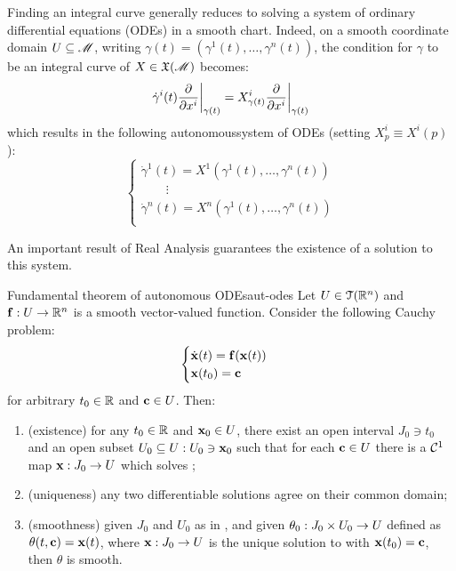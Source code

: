 Finding an integral curve generally reduces to solving a system of ordinary differential equations (ODEs) in a smooth chart. Indeed, on a smooth coordinate domain $ U \subseteq \mathscr{M} $, writing $ \gamma(t) = (\gamma^1(t) , \dots , \gamma^n(t)) $, the condition for $ \gamma $ to be an integral curve of $ X \in \mathfrak{X}(\mathscr{M}) $ becomes:
\begin{equation*}
  \dot{\gamma}^i(t) \frac{\partial}{\partial x^i} \bigg\vert_{\gamma(t)} = X^i_{\gamma(t)} \frac{\partial}{\partial x^i} \bigg\vert_{\gamma(t)}
\end{equation*}
which results in the following autonomous\footnotemark system of ODEs (setting $ X^i_p \equiv X^i(p) $):
\begin{equation}
  \begin{cases}
    \dot{\gamma}^1(t) = X^1(\gamma^1(t) , \dots , \gamma^n(t)) \\
    \qquad \vdots \\
    \dot{\gamma}^n(t) = X^n(\gamma^1(t) , \dots , \gamma^n(t)) \\
  \end{cases}
  \label{eq:aut-sys}
\end{equation}


An important result of Real Analysis guarantees the existence of a solution to this system.

\begin{theorem}{Fundamental theorem of autonomous ODEs}{aut-odes}
  Let $ U \in \EuScript{T}(\mathbb{R}^n) $ and $ \mathbf{f}  : U \rightarrow \mathbb{R}^n $ is a smooth vector-valued function. Consider the following Cauchy problem:
  \begin{equation}
    \begin{cases}
      \dot{\mathbf{x}}(t) = \mathbf{f}(\mathbf{x}(t)) \\
      \mathbf{x}(t_0) = \mathbf{c}
    \end{cases}
    \label{eq:aut-ode-sys}
  \end{equation}
  for arbitrary $ t_0 \in \mathbb{R} $ and $ \mathbf{c} \in U $. Then:
  \begin{enumerate}
    \item \label{item:aut-ode-1} (existence) for any $ t_0 \in \mathbb{R} $ and $ \mathbf{x}_0 \in U $, there exist an open interval $ J_0 \ni t_0 $ and an open subset $ U_0 \subseteq U : U_0 \ni \mathbf{x}_0 $ such that for each $ \mathbf{c} \in U $ there is a $ \mathcal{C}^{1} $ map $ \mathbf{x} : J_0 \rightarrow U $ which solves ;
    \item \label{item:aut-ode-2} (uniqueness) any two differentiable solutions agree on their common domain;
    \item \label{item:aut-ode-3} (smoothness) given $ J_0 $ and $ U_0 $ as in , and given $ \theta_0 : J_0 \times U_0 \rightarrow U $ defined as $ \theta(t,\mathbf{c}) = \mathbf{x}(t) $, where $ \mathbf{x} : J_0 \rightarrow U $ is the unique solution to  with $ \mathbf{x}(t_0) = \mathbf{c} $, then $ \theta $ is smooth.
  \end{enumerate}
\end{theorem}

